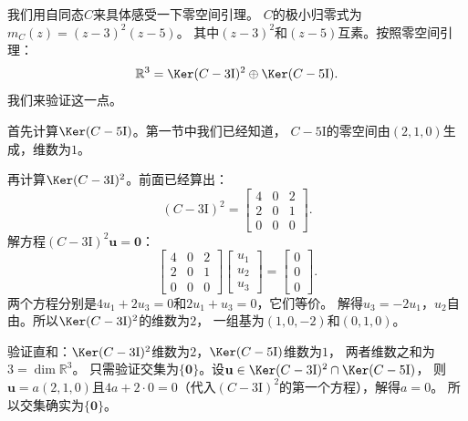 \documentclass[12pt,UTF8,fontset=none]{ctexbook}
\begin{document}
我们用自同态$C$来具体感受一下零空间引理。
$C$的极小归零式为$m_C(z) = (z-3)^2(z-5)$。
其中$(z-3)^2$和$(z-5)$互素。按照零空间引理：
$$
\mathbb{R}^3 = \Ker (C-3\mathrm{I})^2 \oplus \Ker (C-5\mathrm{I}).
$$
我们来验证这一点。

首先计算$\Ker(C-5\mathrm{I})$。第一节中我们已经知道，
$C-5\mathrm{I}$的零空间由$(2,1,0)$生成，维数为$1$。

再计算$\Ker(C-3\mathrm{I})^2$。前面已经算出：
$$
(C-3\mathrm{I})^2 = \begin{bmatrix} 4 & 0 & 2 \\ 2 & 0 & 1 \\ 0 & 0 & 0 \end{bmatrix}.
$$
解方程$(C-3\mathrm{I})^2\mathbf{u} = \mathbf{0}$：
$$
\begin{bmatrix} 4 & 0 & 2 \\ 2 & 0 & 1 \\ 0 & 0 & 0 \end{bmatrix}\begin{bmatrix} u_1 \\ u_2 \\ u_3 \end{bmatrix} = \begin{bmatrix} 0 \\ 0 \\ 0 \end{bmatrix}.
$$
两个方程分别是$4u_1 + 2u_3 = 0$和$2u_1 + u_3 = 0$，它们等价。
解得$u_3 = -2u_1$，$u_2$自由。所以$\Ker(C-3\mathrm{I})^2$的维数为$2$，
一组基为$(1,0,-2)$和$(0,1,0)$。

验证直和：$\Ker(C-3\mathrm{I})^2$维数为$2$，$\Ker(C-5\mathrm{I})$维数为$1$，
两者维数之和为$3 = \dim \mathbb{R}^3$。
只需验证交集为$\{\mathbf{0}\}$。设$\mathbf{u} \in \Ker(C-3\mathrm{I})^2 \cap \Ker(C-5\mathrm{I})$，
则$\mathbf{u} = a(2,1,0)$且$4a + 2\cdot 0 = 0$（代入$(C-3\mathrm{I})^2$的第一个方程），解得$a = 0$。
所以交集确实为$\{\mathbf{0}\}$。
\end{document}

